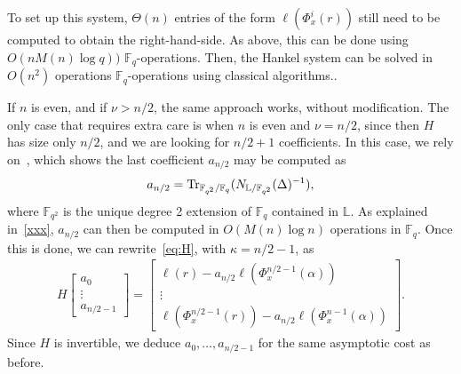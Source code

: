 \documentclass[sigconf]{acmart}
\newcommand{\F}{\mathbb{F}}
\renewcommand{\L}{\mathbb{L}}
\begin{document}
To set up this system, $\Theta(n)$ entries of the form
$\ell(\Phi_x^i(r))$ still need to be computed to obtain the
right-hand-side. As above, this can be done using $O(nM(n)\log q))$
$\F_q$-operations. Then, the Hankel system can be solved in $O(n^2)$
operations $\F_q$-operations using classical algorithms..

If $n$ is even, and if $\nu > n/2$, the same approach works, without
modification. The only case that requires extra care is when $n$ is
even and $\nu = n/2$, since then $H$ has size only $n/2$, and we are
looking for $n/2 + 1$ coefficients. In this case, we rely
on~\cite[Prop.~2.14]{frobdist}, which shows the last coefficient
$a_{n/2}$ may be computed as
\[a_{n/2} = {\rm Tr}_{\F_{q^2}/\F_{q}}(N_{\L/\F_{q^2}}(\Delta)^{-1}),\]
where $\F_{q^2}$ is the unique degree 2 extension of $\F_q$ contained
in $\L$. As explained in~\ref{xxx}, $a_{n/2}$ can then be computed in
$O(M(n)\log n)$ operations in $\F_q$. Once this is done, we can
rewrite~\eqref{eq:H}, with $\kappa = n/2-1$, as
\begin{align*}
H\begin{bmatrix} a_0  \\ \vdots \\ a_{n/2-1} \end{bmatrix} 
= 
\begin{bmatrix} \ell(r)-a_{n/2} \ell(\Phi_x^{n/2-1}(\alpha)) \\ \vdots \\   \ell(\Phi_x^{n/2-1}(r))-a_{n/2}\ell(\Phi_x^{n-1}(\alpha)) \end{bmatrix}. 
\end{align*}
Since $H$ is invertible, we deduce $a_0,\dots,a_{n/2-1}$ for the same
asymptotic cost as before.






\end{document}
